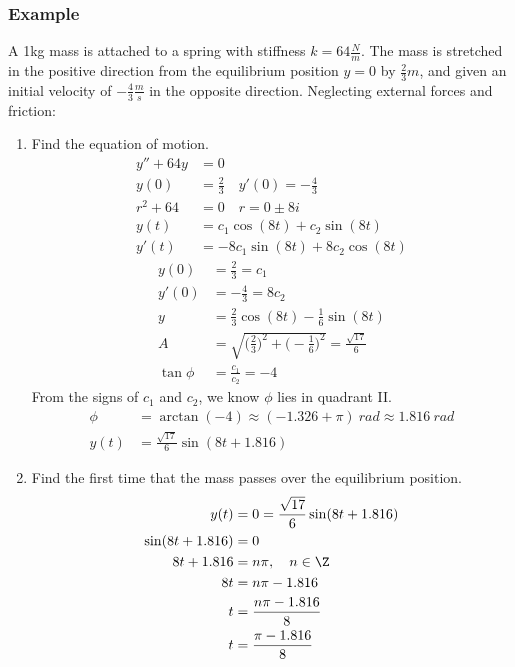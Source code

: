 \documentclass{math}
\begin{document}
\subsubsection*{Example}
A 1kg mass is attached to a spring with stiffness \( k = 64\frac{N}{m} \). The
mass is stretched in the positive direction from the equilibrium position
\( y = 0 \) by \( \frac{2}{3}m \), and given an initial velocity of
\( -\frac{4}{3}\frac{m}{s} \) in the opposite direction. Neglecting external
forces and friction:
\begin{enumerate}
  \item Find the equation of motion.
  \begin{align*}
    y''+64y &= 0 \\
    y(0) &= \frac{2}{3} \quad y'(0) = -\frac{4}{3} \\
    r^2+64 &= 0 \quad r = 0\pm8i \\
    y(t) &= c_1\cos(8t)+c_2\sin(8t) \\
    y'(t) &= -8c_1\sin(8t)+8c_2\cos(8t)
  \end{align*}
  \begin{align*}
    y(0) &= \frac{2}{3} = c_1 \\
    y'(0) &= -\frac{4}{3} = 8c_2 \\
    y &= \frac{2}{3}\cos(8t)-\frac{1}{6}\sin(8t) \\
    A &= \sqrt{\bigg(\frac{2}{3}\bigg)^2+\bigg(-\frac{1}{6}\bigg)^2} =
      \frac{\sqrt{17}}{6} \\
    \tan\phi &= \frac{c_1}{c_2} = -4
  \end{align*}
  From the signs of \( c_1 \) and \( c_2 \), we know \( \phi \) lies in quadrant
  II.
  \begin{align*}
    \phi &= \arctan(-4) \approx (-1.326+\pi)~rad \approx 1.816~rad \\
    y(t) &= \frac{\sqrt{17}}{6}\sin(8t+1.816)
  \end{align*}
  \item Find the first time that the mass passes over the equilibrium position.
  \begin{align*}
    y(t) &= 0 = \frac{\sqrt{17}}{6}\sin(8t+1.816) \\
    \sin(8t+1.816) &= 0 \\
    8t+1.816 &= n\pi, \quad n\in\Z \\
    8t &= n\pi-1.816 \\
    t &= \frac{n\pi-1.816}{8} \\
    t &= \frac{\pi-1.816}{8}
  \end{align*}
\end{enumerate}
\end{document}

